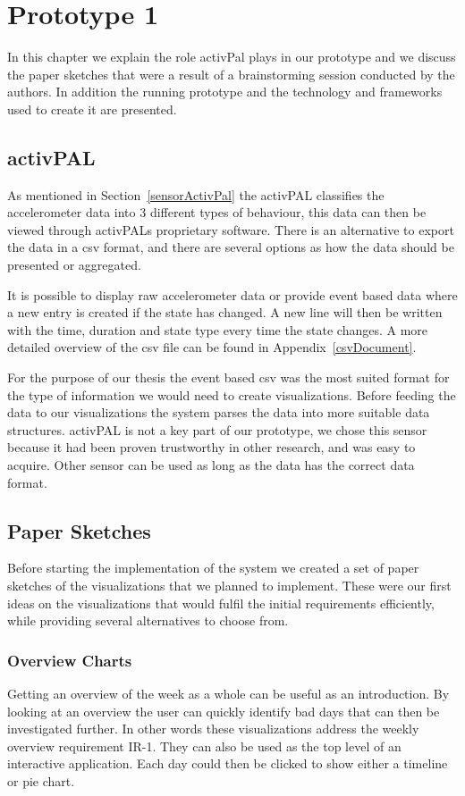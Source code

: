 \chapter{Prototype 1}
\label{ch:prototype1}
In this chapter we explain the role activPal plays in our prototype and we discuss the paper sketches that were a result of a brainstorming session conducted by the authors. In addition the running prototype and the technology and frameworks used to create it are presented.

\section{activPAL}
As mentioned in Section~\ref{sensorActivPal} the activPAL classifies the accelerometer data into 3 different types of behaviour, this data can then be viewed through activPALs proprietary software. There is an alternative to export the data in a \gls{csv} format, and there are several options as how the data should be presented or aggregated. 

It is possible to display raw accelerometer data or provide event based data where a new entry is created if the state has changed. A new line will then be written with the time, duration and state type every time the state changes. A more detailed overview of the \gls{csv} file can be found in Appendix~\ref{csvDocument}.

For the purpose of our thesis the event based \gls{csv} was the most suited format for the type of information we would need to create visualizations. Before feeding the data to our visualizations the system parses the data into more suitable data structures. activPAL is not a key part of our prototype, we chose this sensor because it had been proven trustworthy in other research, and was easy to acquire. Other sensor can be used as long as the data has the correct data format.

\section{Paper Sketches}
\label{sec:paperSketches}
Before starting the implementation of the system we created a set of paper sketches of the visualizations that we planned to implement. These were our first ideas on the visualizations that would fulfil the initial requirements efficiently, while providing several alternatives to choose from.

\subsection{Overview Charts}
Getting an overview of the week as a whole can be useful as an introduction. By looking at an overview the user can quickly identify bad days that can then be investigated further. In other words these visualizations address the weekly overview requirement IR-1. They can also be used as the top level of an interactive application. Each day could then be clicked to show either a timeline or pie chart.

